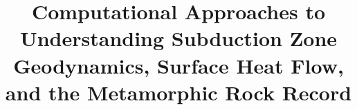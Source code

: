 \usepackage[noprefix,intoc]{nomencl}
  \makenomenclature
  



  \title{Computational Approaches to Understanding Subduction Zone Geodynamics, Surface Heat Flow, and the Metamorphic Rock Record}

\renewcommand{\contentsname}{Table of contents}

\def\maketitle{
  \cleardoublepage
  \begin{titlepage}
    \pagenumbering{roman}
    \begin{center}
        {\huge Computational Approaches to Understanding Subduction Zone Geodynamics, Surface Heat Flow, and the Metamorphic Rock Record \par}
        \vspace*{0.5in}

        {by\\}
        {Buchanan C. Kerswell}
        \vspace*{1in}

        A dissertation\\
        submitted in partial fulfillment \\
        of the requirements for the degree of\\
        Doctor of Philosophy~in~Geosciences\\
        Boise State University
        \vspace*{0.5in}

        March 2022
    \end{center}
  \end{titlepage}
  \let\maketitle\relax
}

